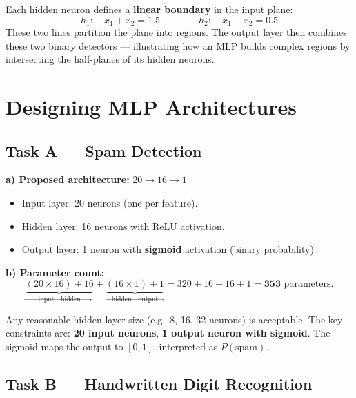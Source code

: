 \documentclass[11pt, a4paper]{article}
\begin{document}
\begin{tcolorbox}[solutionbox]
Each hidden neuron defines a \textbf{linear boundary} in the input plane:
\[
  h_1: \quad x_1 + x_2 = 1.5
  \qquad\qquad
  h_2: \quad x_1 - x_2 = 0.5
\]
These two lines partition the plane into regions. The output layer then combines
these two binary detectors --- illustrating how an MLP builds complex regions by
intersecting the half-planes of its hidden neurons.
\end{tcolorbox}

\section{Designing MLP Architectures}

\subsection*{Task A — Spam Detection}

\textbf{a) Proposed architecture:} $20 \to 16 \to 1$
\begin{itemize}[itemsep=0.2em]
  \item Input layer: 20 neurons (one per feature).
  \item Hidden layer: 16 neurons with ReLU activation.
  \item Output layer: 1 neuron with \textbf{sigmoid} activation (binary probability).
\end{itemize}

\textbf{b) Parameter count:}
\[
  \underbrace{(20 \times 16) + 16}_{\text{input} \to \text{hidden}} +
  \underbrace{(16 \times 1) + 1}_{\text{hidden} \to \text{output}}
  = 320 + 16 + 16 + 1 = \mathbf{353} \text{ parameters.}
\]

\begin{tcolorbox}[answerbox, title={Note on architecture choices}]
Any reasonable hidden layer size (e.g.\ 8, 16, 32 neurons) is acceptable.
The key constraints are: \textbf{20 input neurons}, \textbf{1 output neuron with sigmoid}.
The sigmoid maps the output to $[0,1]$, interpreted as $P(\text{spam})$.
\end{tcolorbox}

\subsection*{Task B — Handwritten Digit Recognition}
\end{document}

